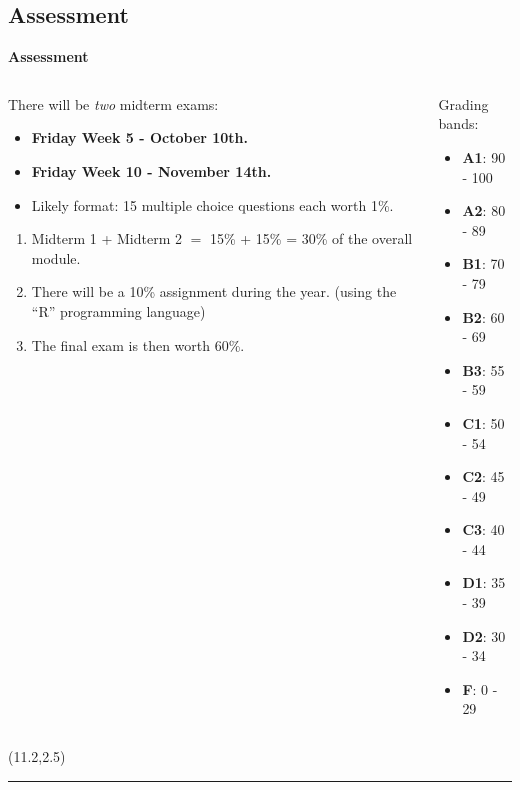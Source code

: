 \documentclass[compress]{beamer}        %
\makeatletter
\newcommand{\tcb}{\textcolor{beamer@blendedblue}}
\makeatother
\begin{document}
\subsection{Assessment}
\begin{frame}{\bf \tcb{Assessment}}
\begin{columns}
\begin{column}{.7\textwidth}
There will be \emph{two} midterm exams:\\
\begin{itemize}\itemsep0.3cm
\item {\bf Friday Week 5 - October 10th.}
\item {\bf Friday Week 10 - November 14th.}
\item Likely format: 15 multiple choice questions
\phantom{Likely format:} each worth 1\%.\\[0.6cm]
\end{itemize}
\begin{enumerate}[$\Rightarrow$]
\item Midterm 1 + Midterm 2 $=$  15\% + 15\% = 30\% of the overall module.\\[0.3cm]
\item There will be a 10\% assignment during the year.
{\footnotesize (using the ``R'' programming language)}\\[0.3cm]
\item The final exam is then worth 60\%.
\end{enumerate}
\end{column}
\begin{column}{.3\textwidth}
\begin{adjustwidth}{0.3cm}{0cm}
\vspace{-1.2cm}
Grading bands:\\[0.2cm]
\begin{small}
\begin{itemize}\itemsep0.05cm
\item {\bf A1}: 90 - 100
\item {\bf A2}: 80 - 89
\item {\bf B1}: 70 - 79
\item {\bf B2}: 60 - 69
\item {\bf B3}: 55 - 59
\item {\bf C1}: 50 - 54
\item {\bf C2}: 45 - 49
\item {\bf C3}: 40 - 44
\item {\bf D1}: 35 - 39
\item {\bf D2}: 30 - 34
\item {\bf F\phantom{1}}: 0 - 29
\end{itemize}
\end{small}
\end{adjustwidth}
\end{column}
\end{columns}
\begin{textblock}{1}(11.2,2.5)
\rule{0.03cm}{6.8cm}
\end{textblock}
\end{frame}
\end{document}
